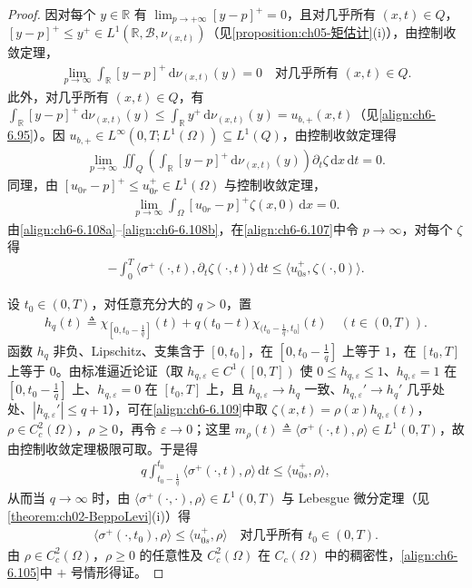 \documentclass[../../main.tex]{subfiles}%
\begin{document}
\begin{proof}
因对每个 $y\in\mathbb{R}$ 有 $\lim_{p\to+\infty}[y-p]^+=0$，且对几乎所有 $(x,t)\in Q$，$[y-p]^+\leqslant y^+\in L^1(\mathbb{R},\mathscr{B},\nu_{(x,t)})$（见\cref{proposition:ch05-矩估计}(i)），由控制收敛定理，
\begin{align*}
\lim_{p\to\infty}\int_\mathbb{R}[y-p]^+\,\mathrm{d}\nu_{(x,t)}(y)=0
\quad\text{对几乎所有 }(x,t)\in Q.
\end{align*}
此外，对几乎所有 $(x,t)\in Q$，有 $\int_\mathbb{R}[y-p]^+\,\mathrm{d}\nu_{(x,t)}(y)\leqslant\int_\mathbb{R}y^+\,\mathrm{d}\nu_{(x,t)}(y)=u_{b,+}(x,t)$（见\eqref{align:ch6-6.95}）。因 $u_{b,+}\in L^\infty(0,T;L^1(\Omega))\subseteq L^1(Q)$，由控制收敛定理得
\begin{align}
\lim_{p\to\infty}\iint_Q\left(\int_\mathbb{R}[y-p]^+\,\mathrm{d}\nu_{(x,t)}(y)\right)\partial_t\zeta\,\mathrm{d}x\,\mathrm{d}t=0. \label{align:ch6-6.108a}
\end{align}
同理，由 $[u_{0r}-p]^+\leqslant u^+_{0r}\in L^1(\Omega)$ 与控制收敛定理，
\begin{align}
\lim_{p\to\infty}\int_\Omega[u_{0r}-p]^+\zeta(x,0)\,\mathrm{d}x=0. \label{align:ch6-6.108b}
\end{align}
由\eqref{align:ch6-6.108a}--\eqref{align:ch6-6.108b}，在\eqref{align:ch6-6.107}中令 $p\to\infty$，对每个 $\zeta$ 得
\begin{align}
-\int_0^T\langle\sigma^+(\cdot,t),\partial_t\zeta(\cdot,t)\rangle\,\mathrm{d}t
\leqslant\langle u^+_{0s},\zeta(\cdot,0)\rangle. \label{align:ch6-6.109}
\end{align}

设 $t_0\in(0,T)$，对任意充分大的 $q>0$，置
\begin{align*}
h_q(t)\triangleq \chi_{[0,t_0-\frac{1}{q}]}(t)+q(t_0-t)\chi_{(t_0-\frac{1}{q},t_0]}(t) \quad(t\in(0,T)).
\end{align*}
函数 $h_q$ 非负、Lipschitz、支集含于 $[0,t_0]$，在 $[0,t_0-\frac{1}{q}]$ 上等于 $1$，在 $[t_0,T]$ 上等于 $0$。由标准逼近论证（取 $h_{q,\varepsilon}\in C^1([0,T])$ 使 $0\leqslant h_{q,\varepsilon}\leqslant1$、$h_{q,\varepsilon}=1$ 在 $[0,t_0-\frac{1}{q}]$ 上、$h_{q,\varepsilon}=0$ 在 $[t_0,T]$ 上，且 $h_{q,\varepsilon}\to h_q$ 一致、$h_{q,\varepsilon}'\to h_q'$ 几乎处处、$|h_{q,\varepsilon}'|\leqslant q+1$），可在\eqref{align:ch6-6.109}中取 $\zeta(x,t)=\rho(x)h_{q,\varepsilon}(t)$，$\rho\in C^2_c(\Omega)$，$\rho\geqslant0$，再令 $\varepsilon\to0$；这里 $m_\rho(t)\triangleq\langle\sigma^+(\cdot,t),\rho\rangle\in L^1(0,T)$，故由控制收敛定理极限可取。于是得
\begin{align*}
q\int_{t_0-\frac{1}{q}}^{t_0}\langle\sigma^+(\cdot,t),\rho\rangle\,\mathrm{d}t\leqslant\langle u^+_{0s},\rho\rangle,
\end{align*}
从而当 $q\to\infty$ 时，由 $\langle\sigma^+(\cdot,\cdot),\rho\rangle\in L^1(0,T)$ 与 Lebesgue 微分定理（见\cref{theorem:ch02-BeppoLevi}(i)）得
\begin{align*}
\langle\sigma^+(\cdot,t_0),\rho\rangle\leqslant\langle u^+_{0s},\rho\rangle
\quad\text{对几乎所有 }t_0\in(0,T).
\end{align*}
由 $\rho\in C^2_c(\Omega)$，$\rho\geqslant0$ 的任意性及 $C^2_c(\Omega)$ 在 $C_c(\Omega)$ 中的稠密性，\eqref{align:ch6-6.105}中 $+$ 号情形得证。


\end{proof}
\end{document}
